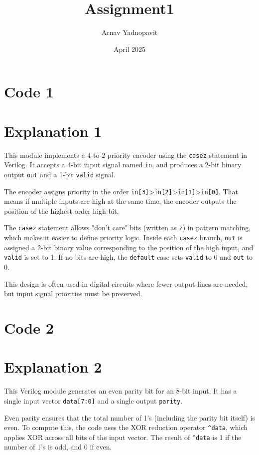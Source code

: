 \documentclass{article}
\title{Assignment1}
\author{Arnav Yadnopavit}
\date{April 2025}
\begin{document}
\maketitle


\section*{Code 1}


\section*{Explanation 1}
This module implements a 4-to-2 priority encoder using the \texttt{casez} statement in Verilog. It accepts a 4-bit input signal named \texttt{in}, and produces a 2-bit binary output \texttt{out} and a 1-bit \texttt{valid} signal.

The encoder assigns priority in the order \texttt{in[3]}\textgreater\texttt{in[2]}\textgreater\texttt{in[1]}\textgreater\texttt{in[0]}. That means if multiple inputs are high at the same time, the encoder outputs the position of the highest-order high bit.

The \texttt{casez} statement allows "don’t care" bits (written as \texttt{z}) in pattern matching, which makes it easier to define priority logic. Inside each \texttt{casez} branch, \texttt{out} is assigned a 2-bit binary value corresponding to the position of the high input, and \texttt{valid} is set to 1. If no bits are high, the \texttt{default} case sets \texttt{valid} to 0 and \texttt{out} to 0.

This design is often used in digital circuits where fewer output lines are needed, but input signal priorities must be preserved.

\section*{Code 2}


\section*{Explanation 2}
This Verilog module generates an even parity bit for an 8-bit input. It has a single input vector \texttt{data[7:0]} and a single output \texttt{parity}.

Even parity ensures that the total number of 1's (including the parity bit itself) is even. To compute this, the code uses the XOR reduction operator \texttt{\^{}data}, which applies XOR across all bits of the input vector. The result of \texttt{\^{}data} is 1 if the number of 1's is odd, and 0 if even.
\end{document}

